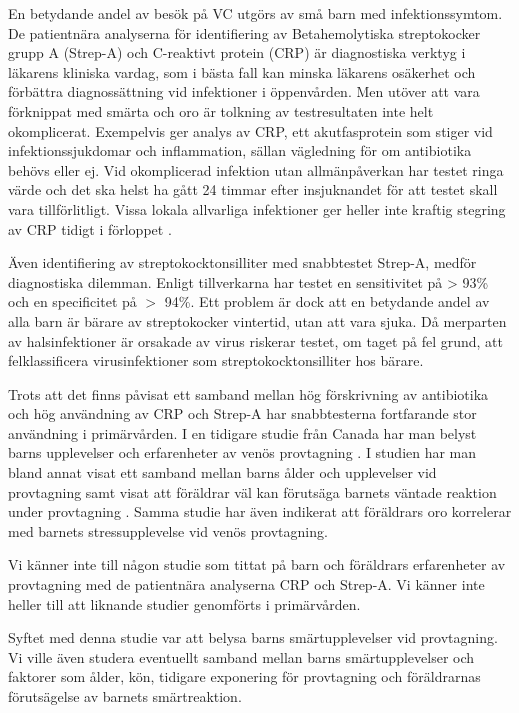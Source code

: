 \documentclass[12pt,twocolumn]{article}
\begin{document}
En betydande andel av bes\"ok p\r{a} VC utg\"ors av sm\r{a} barn med
infektionssymtom. De patientn\"ara analyserna f\"or identifiering av
Betahemolytiska streptokocker grupp A (Strep-A) och C-reaktivt protein (CRP)
\"ar diagnostiska verktyg i l\"akarens kliniska vardag, som i b\"asta fall kan
minska l\"akarens os\"akerhet och f\"orb\"attra diagnoss\"attning vid
infektioner i \"oppenv\r{a}rden. Men ut\"over att vara f\"orknippat med sm\"arta
och oro \"ar tolkning av testresultaten inte helt okomplicerat.
Exempelvis ger analys av CRP, ett akutfasprotein som stiger vid
infektionssjukdomar och inflammation, s\"allan v\"agledning f\"or om antibiotika
beh\"ovs eller ej. Vid okomplicerad infektion utan allm\"anp\r{a}verkan har
testet ringa v\"arde och det ska helst ha g\r{a}tt 24 timmar efter insjuknandet
f\"or att testet skall vara tillf\"orlitligt. Vissa lokala allvarliga
infektioner ger heller inte kraftig stegring av CRP tidigt i f\"orloppet
\cite{Tecken2014}.

\"Aven identifiering av streptokocktonsilliter med snabbtestet Strep-A, medf\"or
diagnostiska dilemman. Enligt tillverkarna har testet en sensitivitet p\r{a} >
93\% och en specificitet p\r{a} $>$ 94\%. Ett problem \"ar dock att en betydande
andel av alla barn \"ar b\"arare av streptokocker vintertid, utan att vara
sjuka. D\r{a} merparten av halsinfektioner \"ar orsakade av virus riskerar
testet, om taget p\r{a} fel grund, att felklassificera virusinfektioner som
streptokocktonsilliter hos b\"arare.

Trots att det finns p\r{a}visat ett samband mellan h\"og f\"orskrivning av
antibiotika och h\"og anv\"andning av CRP och Strep-A \cite{Studie2014} har
snabbtesterna fortfarande stor anv\"andning i prim\"arv\r{a}rden. I en tidigare
studie fr\r{a}n Canada har man belyst barns upplevelser och erfarenheter av
ven\"os provtagning \cite{Fradet1990}. I studien har man bland annat visat ett
samband mellan barns \r{a}lder och upplevelser vid provtagning samt visat att
f\"or\"aldrar v\"al kan f\"oruts\"aga barnets v\"antade reaktion under
provtagning \cite{Fradet1990}. Samma studie har \"aven indikerat att
f\"or\"aldrars oro korrelerar med barnets stressupplevelse vid ven\"os
provtagning.

Vi k\"anner inte till n\r{a}gon studie som tittat p\r{a} barn och f\"or\"aldrars
erfarenheter av provtagning med de patientn\"ara analyserna CRP och Strep-A. Vi
k\"anner inte heller till att liknande studier genomf\"orts i
prim\"arv\r{a}rden.

Syftet med denna studie var att belysa barns sm\"artupplevelser vid provtagning.
Vi ville \"aven studera eventuellt samband mellan barns sm\"artupplevelser och
faktorer som \r{a}lder, k\"on, tidigare exponering f\"or provtagning och
f\"or\"aldrarnas f\"oruts\"agelse av barnets sm\"artreaktion.
\end{document}
